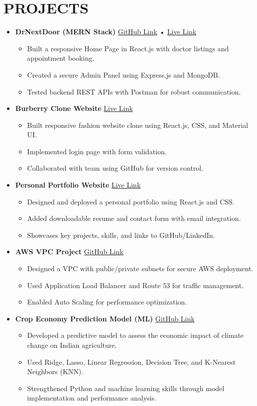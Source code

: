 \documentclass[a4paper,10pt]{article}
\newcommand{\resheading}[1]{\vspace{-5pt}\section*{\uppercase{#1}}\vspace{-6pt}}
\newcommand{\resitem}[1]{\item #1 \vspace{-4pt}}
\begin{document}
\resheading{Projects}
\begin{itemize}[leftmargin=0.15in, itemsep=8pt, topsep=1pt]

  \item \textbf{DrNextDoor (MERN Stack)} \hfill 
  \href{https://github.com/swapnilshikha/DrNextDoor}{GitHub Link} • 
  \href{https://dr-next-door-jbnk.vercel.app/}{Live Link}
  \begin{itemize}[itemsep=2pt, topsep=1pt]
    \resitem{Built a responsive Home Page in React.js with doctor listings and appointment booking.}
    \resitem{Created a secure Admin Panel using Express.js and MongoDB.}
    \resitem{Tested backend REST APIs with Postman for robust communication.}
  \end{itemize}

  \item \textbf{Burberry Clone Website} \hfill \href{https://coding-comandoes.github.io/Burberry-Clone/}{Live Link}
  \begin{itemize}[itemsep=2pt, topsep=1pt]
    \resitem{Built responsive fashion website clone using React.js, CSS, and Material UI.}
    \resitem{Implemented login page with form validation.}
    \resitem{Collaborated with team using GitHub for version control.}
  \end{itemize}

  \item \textbf{Personal Portfolio Website} \hfill \href{https://swapnilshikha.xyz/}{Live Link}
  \begin{itemize}[itemsep=2pt, topsep=1pt]
    \resitem{Designed and deployed a personal portfolio using React.js and CSS.}
    \resitem{Added downloadable resume and contact form with email integration.}
    \resitem{Showcases key projects, skills, and links to GitHub/LinkedIn.}
  \end{itemize}

  \item \textbf{AWS VPC Project} \hfill \href{https://github.com/swapnilshikha/AWS-Project}{GitHub Link}
  \begin{itemize}[itemsep=2pt, topsep=1pt]
    \resitem{Designed a VPC with public/private subnets for secure AWS deployment.}
    \resitem{Used Application Load Balancer and Route 53 for traffic management.}
    \resitem{Enabled Auto Scaling for performance optimization.}
  \end{itemize}

  \item \textbf{Crop Economy Prediction Model (ML)} \hfill \href{https://github.com/swapnilshikha/Climate_change_on_agriculture}{GitHub Link}
  \begin{itemize}[itemsep=2pt, topsep=1pt]
    \resitem{Developed a predictive model to assess the economic impact of climate change on Indian agriculture.}
    \resitem{Used Ridge, Lasso, Linear Regression, Decision Tree, and K-Nearest Neighbors (KNN).}
    \resitem{Strengthened Python and machine learning skills through model implementation and performance analysis.}
  \end{itemize}

\end{itemize}
\end{document}
